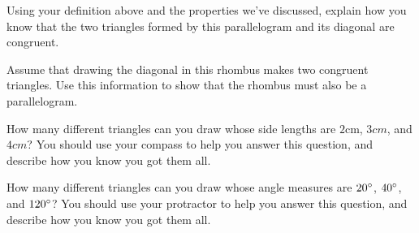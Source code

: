 \documentclass[nooutcomes]{ximera}
\begin{document}
\begin{problem}
Using your definition above and the properties we've discussed, explain how you know that the two triangles formed by this parallelogram and its diagonal are congruent.

\begin{center}
\end{center}
\end{problem}



\begin{problem}
Assume that drawing the diagonal in this rhombus makes two congruent triangles.  Use this information to show that the rhombus must also be a parallelogram.
\begin{center}
\end{center}


\end{problem}

\begin{problem}
How many different triangles can you draw whose side lengths are $2$cm, $3cm$, and $4cm$?  You should use your compass to help you answer this question, and describe how you know you got them all.
\end{problem}

\begin{problem}
How many different triangles can you draw whose angle measures are $20\degree$, $40\degree$, and $120\degree$?  You should use your protractor to help you answer this question, and describe how you know you got them all.
\end{problem}

\newpage
\end{document}
